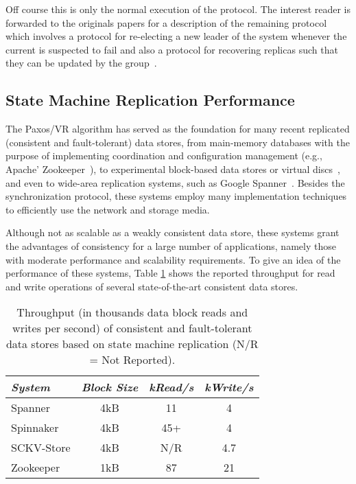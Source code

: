 Off course this is only the normal execution of the protocol. 
The interest reader is forwarded to the originals papers  for a description of the remaining protocol which involves a protocol for re-electing a new leader of the system whenever the current is suspected to fail and also a protocol for recovering replicas such that they can be updated by the group~\cite{Liskov:2012ut,Liskov:2010vt}. 



\subsection{State Machine Replication Performance}
\label{sec:related:state-mach-repl}
The Paxos/VR algorithm has served as the foundation for many recent replicated (consistent and fault-tolerant) data stores, from main-memory databases with the purpose of implementing coordination and configuration management (e.g., Apache'  Zookeeper~\cite{Hun10}), to experimental block-based data stores or virtual discs~\cite{Rao11,Bol11,Bes13}, and even to wide-area replication systems, such as Google Spanner~\cite{Corbett:2012uz}.
Besides the synchronization protocol, these systems employ many implementation techniques to efficiently use the network and storage media.

Although not as scalable as a weakly consistent data store, these systems grant the advantages of consistency for a large number of applications, namely those with moderate performance and scalability requirements. To give an idea of the performance of these systems, Table \ref{table:smr-results} shows the reported throughput for read and write operations of several state-of-the-art consistent data stores.

\begin{table}
  \center
    \begin{tabular}{ lccc}
    \hline
    \emph{System} & \emph{Block Size} & \emph{kRead/s} & \emph{kWrite/s} \\ \toprule
    Spanner \cite{Corbett:2012uz} & 4kB & 11 & 4 \\ 
    Spinnaker \cite{Rao11} & 4kB & 45+ & 4 \\  
    SCKV-Store \cite{Bes13} & 4kB & N/R & 4.7 \\ 
    Zookeeper \cite{Hun10} & 1kB & 87 & 21 \\ \bottomrule 
    \end{tabular}
  \caption[Performance of state machine replication systems]{Throughput (in thousands data block reads and writes per second) of consistent and fault-tolerant data stores based on state machine replication (N/R = Not Reported).}
  \label{table:smr-results}
\end{table}

